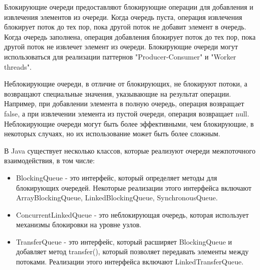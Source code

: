 Блокирующие очереди предоставляют блокирующие операции для добавления и извлечения элементов из очереди. Когда очередь пуста, операция извлечения блокирует поток до тех пор, пока другой поток не добавит элемент в очередь. Когда очередь заполнена, операция добавления блокирует поток до тех пор, пока другой поток не извлечет элемент из очереди. Блокирующие очереди могут использоваться для реализации паттернов "Producer-Consumer" и "Worker threads".

Неблокирующие очереди, в отличие от блокирующих, не блокируют потоки, а возвращают специальные значения, указывающие на результат операции. Например, при добавлении элемента в полную очередь, операция возвращает false, а при извлечении элемента из пустой очереди, операция возвращает null. Неблокирующие очереди могут быть более эффективными, чем блокирующие, в некоторых случаях, но их использование может быть более сложным.

В Java существует несколько классов, которые реализуют очереди межпоточного взаимодействия, в том числе:

\begin{itemize}
\item BlockingQueue - это интерфейс, который определяет методы для блокирующих очередей. Некоторые реализации этого интерфейса включают ArrayBlockingQueue, LinkedBlockingQueue, SynchronousQueue.

\item ConcurrentLinkedQueue - это неблокирующая очередь, которая использует механизмы блокировки на уровне узлов.

\item TransferQueue - это интерфейс, который расширяет BlockingQueue и добавляет метод transfer(), который позволяет передавать элементы между потоками. Реализации этого интерфейса включают LinkedTransferQueue.
\end{itemize}


